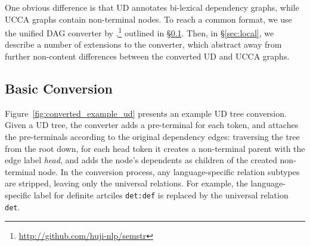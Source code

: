 \documentclass[11pt,a4paper]{article}
\newcommand{\daniel}[1]{\footnote{\color{blue}DH: #1}}
\begin{document}
One obvious difference is that UD annotates bi-lexical dependency graphs,
while UCCA graphs contain non-terminal nodes.
To reach a common format, we use the unified DAG converter by
\citet{hershcovich2018multitask,hershcovich2018universal},\footnote{\url{http://github.com/huji-nlp/semstr}}
outlined in \S\ref{sec:conversion}.
Then, in \S\ref{sec:local}, we describe a number of extensions
to the converter, which abstract away from further non-content differences between the converted
UD and UCCA graphs.










\subsection{Basic Conversion}\label{sec:conversion}

Figure~\ref{fig:converted_example_ud} presents an example UD tree conversion.
Given a UD tree, the converter adds a pre-terminal for each token,
and attaches the pre-terminals according to the original dependency edges:
traversing the tree from the root down, for each head token it creates a non-terminal
parent with the edge label {\it head}, and adds the node's dependents as children of 
the created non-terminal node.
In the conversion process, any language-specific relation subtypes are stripped,
leaving only the universal relations.
For example, the language-specific label for definite artciles
\texttt{det:def} is replaced by the universal relation \texttt{det}.
\end{document}
